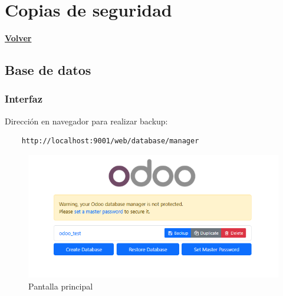 \documentclass[a4paper,12pt]{article}
\begin{document}
\clearpage

\section{Copias de seguridad}
\hyperlink{anchor-indice}{\textbf{Volver}}\\

\subsection{Base de datos}

\subsubsection{Interfaz}

Dirección en navegador para realizar backup:
\begin{verbatim}
    http://localhost:9001/web/database/manager
\end{verbatim}


\begin{figure}[h!]
    \centering
    \includegraphics[width=1\textwidth]{pr2odoo76-backupInterfazPrincipal.png}
    \caption{Pantalla principal}
\end{figure}
\FloatBarrier
\end{document}
